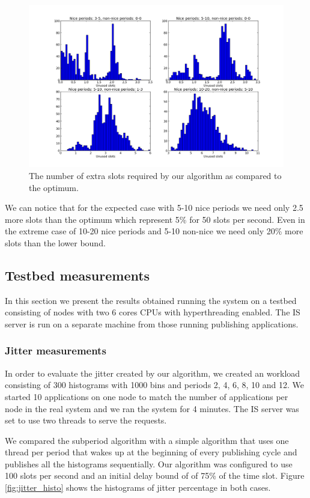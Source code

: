 \begin{figure}[ht]
\centering
\includegraphics[scale=0.40]{Images/unused_slots.png}
\caption{The number of extra slots required by our algorithm as compared to the optimum.}
\label{fig:unused_slots}
\end{figure}

We can notice that for the expected case with 5-10 nice periods we need only 2.5 more slots than the optimum which represent 5\% for 50 slots per second. Even in the extreme case of 10-20 nice periods and 5-10 non-nice we need only 20\% more slots than the lower bound.

\subsection*{Testbed measurements}
In this section we present the results obtained running the system on a testbed consisting of nodes with two 6 cores CPUs with hyperthreading enabled. The IS server is run on a separate machine from those running publishing applications.

\subsubsection*{Jitter measurements}

In order to evaluate the jitter created by our algorithm, we created an workload consisting of 300 histograms with 1000 bins and periods 2, 4, 6, 8, 10 and 12. We started 10 applications on one node to match the number of applications per node in the real system and we ran the system for 4 minutes. The IS server was set to use two threads to serve the requests.

We compared the subperiod algorithm with a simple algorithm that uses one thread per period that wakes up at the beginning of every publishing cycle and publishes all the histograms sequentially. Our algorithm was configured to use 100 slots per second and an initial delay bound of of 75\% of the time slot. Figure \ref{fig:jitter_histo} shows the histograms of jitter percentage in both cases.

